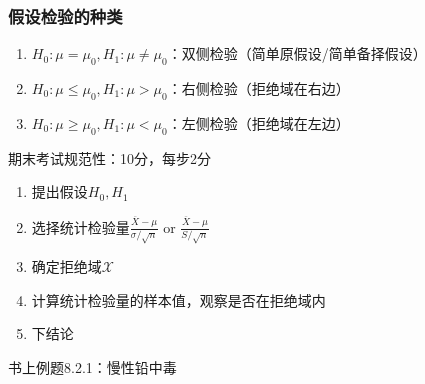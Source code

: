 \subsubsection*{假设检验的种类}%
\label{subsub:假设检验的种类}
\begin{enumerate}
    \item $H_0:\mu=\mu_0,H_1:\mu\neq \mu_0$：双侧检验（简单原假设/简单备择假设）
    \item $H_0:\mu\le \mu_0,H_1:\mu>\mu_0$：右侧检验（拒绝域在右边）
    \item $H_0:\mu\ge \mu_0,H_1:\mu<\mu_0$：左侧检验（拒绝域在左边）
\end{enumerate}
\begin{notation}
    期末考试规范性：10分，每步2分
    \begin{enumerate}
        \item 提出假设$H_0,H_1$
        \item 选择统计检验量$\frac{\overline{X}-\mu}{\sigma /\sqrt{n}} \text{ or } \frac{\overline{X}-\mu}{S /\sqrt{n}}$
        \item 确定拒绝域$\mathscr{X}$
        \item 计算统计检验量的样本值，观察是否在拒绝域内
        \item 下结论
    \end{enumerate}
\end{notation}
\begin{eg}
书上例题8.2.1：慢性铅中毒
\end{eg}

